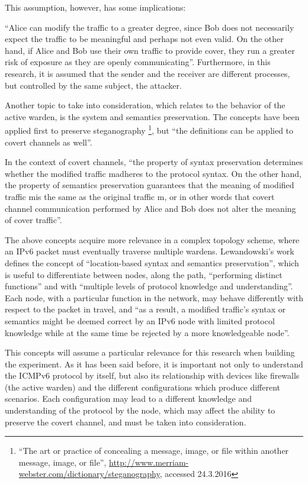 \documentclass[12pt]{article}
\begin{document}
This assumption, however, has some implications:

``Alice can modify the traffic to a greater degree, since Bob does not necessarily expect the traffic to be meaningful and perhaps not even valid. On the other hand, if Alice and Bob use their own traffic to provide cover, they run a greater risk of exposure as they are openly communicating''\cite{lewandowski}. Furthermore, in this research, it is assumed that the sender and the receiver are different processes, but controlled by the same subject, the attacker.

Another topic to take into consideration, which relates to the behavior of the active warden, is the system and semantics preservation. The concepts have been applied first to preserve steganography \footnote{``The art or practice of concealing a message, image, or file within another message, image, or file'', \url{http://www.merriam-webster.com/dictionary/steganography}, accessed 24.3.2016}\cite{lucena2}, but ``the definitions can be applied to covert channels as well''\cite{lewandowski}.

In the context of covert channels, ``the property of syntax preservation determines whether the modified traffic m\textprime\hspace{2pt}adheres to the protocol syntax. On the other hand, the property of semantics preservation guarantees that the meaning of modified traffic m\textprime\hspace{2pt}is the same as the original traffic m, or in other words that covert channel communication performed by Alice and Bob does not alter the meaning of cover traffic''\cite{lewandowski}.

The above concepts acquire more relevance in a complex topology scheme, where an IPv6 packet must eventually traverse multiple wardens. Lewandowski's work defines the concept of ``location-based syntax and semantics preservation'', which is useful to differentiate between nodes, along the path, ``performing distinct functions'' and with ``multiple levels of protocol knowledge and understanding''. Each node, with a particular function in the network, may behave differently with respect to the packet in travel, and ``as a result, a modified traffic’s syntax or semantics might be deemed correct by an IPv6 node with limited protocol knowledge while at  the same time be rejected by a more knowledgeable node''\cite{lewandowski}.

This concepts will assume a particular relevance for this research when building the experiment. As it has been said before, it is important not only to understand the ICMPv6 protocol by itself, but also its relationship with devices like firewalls (the active warden) and the different configurations which produce different scenarios. Each configuration may lead to a different knowledge and understanding of the protocol by the node, which may affect the ability to preserve the covert channel, and must be taken into consideration. 
\end{document}

